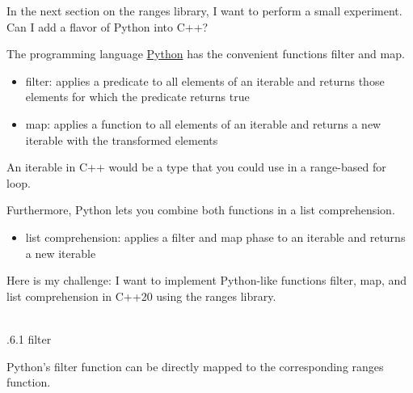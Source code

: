 In the next section on the ranges library, I want to perform a small experiment. Can I add a flavor of Python into C++?


The programming language \href{https://www.python.org/}{Python} has the convenient functions filter and map.

\begin{itemize}
\item 
filter: applies a predicate to all elements of an iterable and returns those elements for which the predicate returns true

\item 
map: applies a function to all elements of an iterable and returns a new iterable with the transformed elements
\end{itemize}

An iterable in C++ would be a type that you could use in a range-based for loop.

Furthermore, Python lets you combine both functions in a list comprehension.

\begin{itemize}
\item 
list comprehension: applies a filter and map phase to an iterable and returns a new iterable
\end{itemize}

Here is my challenge: I want to implement Python-like functions filter, map, and list comprehension in C++20 using the ranges library.

\hspace*{\fill} \\ %
.6.1\hspace{0.2cm} filter

Python’s filter function can be directly mapped to the corresponding ranges function.

